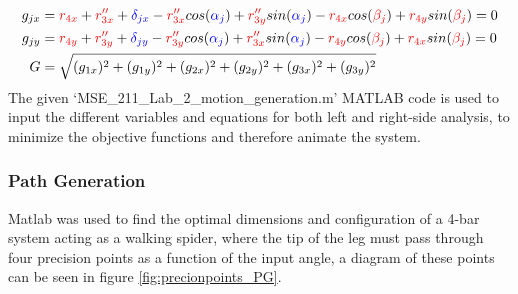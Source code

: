 \documentclass[12pt]{article}
\begin{document}
\begin{align}
    g_{jx}&=\color{red}r_{4x}\color{black}+\color{red}r''_{3x}\color{black}+\color{blue}\delta_{jx}\color{black}-\color{red}r''_{3x}\color{black}cos(\color{blue}\alpha_j\color{black})+\color{red}r''_{3y}\color{black}sin(\color{blue}\alpha_j\color{black})-\color{red}r_{4x}\color{black}cos(\color{red}\beta_j\color{black})+\color{red}r_{4y}\color{black}sin(\color{red}\beta_j\color{black})=0\\
    g_{jy}&=\color{red}r_{4y}\color{black}+\color{red}r''_{3y}\color{black}+\color{blue}\delta_{jy}\color{black}-\color{red}r''_{3y}\color{black}cos(\color{blue}\alpha_j\color{black})+\color{red}r''_{3x}\color{black}sin(\color{blue}\alpha_j\color{black})-\color{red}r_{4y}\color{black}cos(\color{red}\beta_j\color{black})+\color{red}r_{4x}\color{black}sin(\color{red}\beta_j\color{black})=0\\
    G&=\sqrt{(g_{1x})^2+(g_{1y})^2+(g_{2x})^2+(g_{2y})^2+(g_{3x})^2+(g_{3y})^2}
\end{align}
The given ‘MSE\_211\_Lab\_2\_motion\_generation.m’ MATLAB code is used to input the different variables and equations for both left and right-side analysis, to minimize the objective functions and therefore animate the system.
\subsubsection{Path Generation}
Matlab was used to find the optimal dimensions and configuration of a 4-bar system acting as a walking spider, where the tip of the leg must pass through four precision points as a function of the input angle, a diagram of these points can be seen in figure \ref{fig:precionpoints_PG}.
\end{document}
